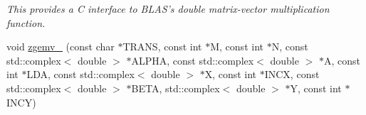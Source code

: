 \begin{DoxyCompactItemize}
\begin{DoxyCompactList}\small\item\em This provides a C interface to B\-L\-A\-S's double matrix-\/vector multiplication function. \end{DoxyCompactList}\item 
\hypertarget{namespacekeycpp_aea174778653491b5fd21dd2960c0f7cb}{void \hyperlink{namespacekeycpp_aea174778653491b5fd21dd2960c0f7cb}{zgemv\-\_\-} (const char $\ast$T\-R\-A\-N\-S, const int $\ast$M, const int $\ast$N, const std\-::complex$<$ double $>$ $\ast$A\-L\-P\-H\-A, const std\-::complex$<$ double $>$ $\ast$A, const int $\ast$L\-D\-A, const std\-::complex$<$ double $>$ $\ast$X, const int $\ast$I\-N\-C\-X, const std\-::complex$<$ double $>$ $\ast$B\-E\-T\-A, std\-::complex$<$ double $>$ $\ast$Y, const int $\ast$I\-N\-C\-Y)}\label{namespacekeycpp_aea174778653491b5fd21dd2960c0f7cb}


\end{DoxyCompactItemize}
